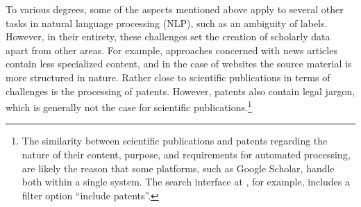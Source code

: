
To various degrees, some of the aspects mentioned above apply to several other tasks in natural language processing (NLP), such as an ambiguity of labels. However, in their entirety, these challenges set the creation of scholarly data apart from other areas. For example, approaches concerned with news articles contain less specialized content, and in the case of websites the source material is more structured in nature. Rather close to scientific publications in terms of challenges is the processing of patents. However, patents also contain legal jargon, which is generally not the case for scientific publications.\footnote{The similarity between scientific publications and patents regarding the nature of their content, purpose, and requirements for automated processing, are likely the reason that some platforms, such as Google Scholar, handle both within a single system. The search interface at , for example, includes a filter option ``include patents''.}

